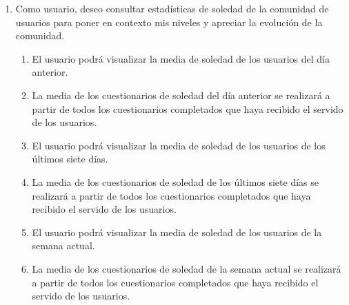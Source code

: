         \begin{enumerate}[resume=req-usuario,label=\textbf{\texttt{RU-\arabic*}}]
            \item \label{req:usuario:comunidad_soledad}  Como usuario, deseo consultar estadísticas de soledad de la comunidad de usuarios para poner en contexto mis niveles y apreciar la evolución de la comunidad.
            \begin{enumerate}[resume=req-funcionales,label=\textbf{\texttt{RF-\arabic*}}]
                \item \label{req:funcionales:comunidad_soledad_dia_anterior_ver} El usuario podrá visualizar la media de soledad de los usuarios del día anterior.
                \item \label{req:funcionales:comunidad_soledad_dia_anterior_criterio} La media de los cuestionarios de soledad del día anterior se realizará a partir de todos los cuestionarios completados que haya recibido el servido de los usuarios.
                \item \label{req:funcionales:comunidad_soledad_siete_dias_ver} El usuario podrá visualizar la media de soledad de los usuarios de los últimos siete días.
                \item \label{req:funcionales:comunidad_soledad_siete_dias_criterio} La media de los cuestionarios de soledad de los últimos siete días se realizará a partir de todos los cuestionarios completados que haya recibido el servido de los usuarios.
                \item \label{req:funcionales:comunidad_soledad_semana_actual_ver} El usuario podrá visualizar la media de soledad de los usuarios de la semana actual.
                \item \label{req:funcionales:comunidad_soledad_semana_actual_criterio} La media de los cuestionarios de soledad de la semana actual se realizará a partir de todos los cuestionarios completados que haya recibido el servido de los usuarios.
            \end{enumerate}
        \end{enumerate}
        
            
